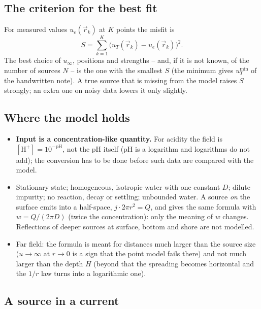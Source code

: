 \documentclass{article}
\begin{document}
\subsection{The criterion for the best fit}

For measured values $u_e(\vec r_k)$ at $K$ points the misfit is
\[
S=\sum_{k=1}^{K}\bigl(u_T(\vec r_k)-u_e(\vec r_k)\bigr)^2 .
\tag{5}
\]
The best choice of $u_\infty$, positions and strengths -- and, if it is not known, of
the number of sources $N$ -- is the one with the smallest $S$ (the minimum gives
$u_T^{\min}$ of the handwritten note). A true source that is missing from the model
raises $S$ strongly; an extra one on noisy data lowers it only slightly.

\subsection{Where the model holds}

\begin{itemize}
\item \textbf{Input is a concentration-like quantity.} For acidity the field is
      $[\mathrm H^+]=10^{-\mathrm{pH}}$, not the pH itself (pH is a logarithm and
      logarithms do not add); the conversion has to be done before such data are
      compared with the model.
\item Stationary state; homogeneous, isotropic water with one constant $D$;
      dilute impurity; no reaction, decay or settling; unbounded water. A source
      \emph{on} the surface emits into a half-space, $j\cdot2\pi r^2=Q$, and
      gives the same formula with $w=Q/(2\pi D)$ (twice the concentration): only
      the meaning of $w$ changes. Reflections of deeper sources at surface,
      bottom and shore are not modelled.
\item Far field: the formula is meant for distances much larger than the source
      size ($u\to\infty$ at $r\to0$ is a sign that the point model fails there)
      and not much larger than the depth $H$ (beyond that the spreading becomes
      horizontal and the $1/r$ law turns into a logarithmic one).
\end{itemize}

\subsection{A source in a current}
\end{document}
